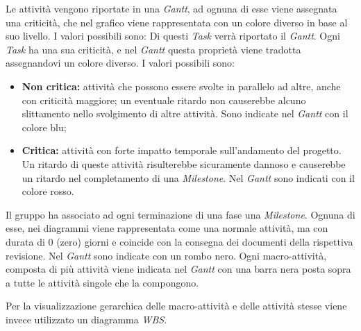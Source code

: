 \documentclass[a4paper]{article}
\begin{document}
		Le attività vengono riportate in una \emph{Gantt}, ad ognuna di esse viene assegnata una criticità, che nel grafico 
		viene rappresentata con un colore diverso in base al suo livello. I valori possibili sono:
		Di questi \emph{Task} verrà riportato il \emph{Gantt}. Ogni \emph{Task} ha una sua criticità, 
		e nel \emph{Gantt} questa proprietà viene tradotta assegnandovi un colore diverso. I valori possibili sono:
		\begin{itemize}
			\item \textbf{Non critica:} attività che possono essere svolte in parallelo ad altre, anche con criticità maggiore;
			un eventuale ritardo non causerebbe alcuno slittamento nello svolgimento di altre attività. Sono indicate nel 
			\emph{Gantt} con il colore blu;
			\item \textbf{Critica:} attività con forte impatto temporale sull'andamento del progetto. Un ritardo di queste
			attività risulterebbe sicuramente dannoso e causerebbe un ritardo nel completamento di una \emph{Milestone}. 
			Nel \emph{Gantt} sono indicati con il colore rosso.
		\end{itemize}
		
		Il gruppo ha associato ad ogni terminazione di una fase una \emph{Milestone}. Ognuna di esse, nei diagrammi viene rappresentata 
		come una normale attività, ma con durata di 0 (zero) giorni e coincide con la consegna dei documenti della rispettiva revisione.
		Nel \emph{Gantt} sono indicate con un rombo nero.
		Ogni macro-attività, composta di più attività viene indicata nel \emph{Gantt} con una barra nera posta sopra a tutte le attività 
		singole che la compongono.
		
		Per la visualizzazione gerarchica delle macro-attività e delle attività stesse viene invece utilizzato un diagramma \emph{WBS}.
		
\end{document}
